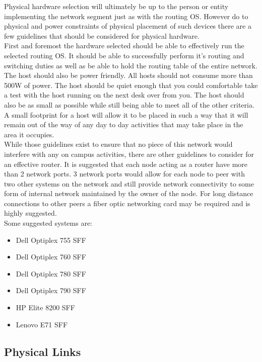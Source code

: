 \documentclass[12pt]{article}
\begin{document}
Physical hardware selection will ultimately be up to the person or entity implementing the network segment just as with the routing OS. However
do to physical and power constraints of physical placement of such devices there are a few guidelines that should be considered for physical hardware.
\\

First and foremost the hardware selected should be able to effectively run the selected routing OS. It should be able to successfully perform it's routing
and switching duties as well as be able to hold the routing table of the entire network. The host should also be power friendly. All hosts should not consume
more than 500W of power. The host should be quiet enough that you could comfortable take a test with the host running on the next desk over from you. The host
should also be as small as possible while still being able to meet all of the other criteria. A small footprint for a host will allow it to be placed in such
a way that it will remain out of the way of any day to day activities that may take place in the area it occupies.
\\

While those guidelines exist to ensure that no piece of this network would interfere with any on campus activities, there are other guidelines to consider
for an effective router. It is suggested that each node acting as a router have more than 2 network ports. 3 network ports would allow for each node to peer
with two other systems on the network and still provide network connectivity to some form of internal network maintained by the owner of the node. For long
distance connections to other peers a fiber optic networking card may be required and is highly suggested.
\\

Some suggested systems are:

\begin{itemize}
	\item Dell Optiplex 755 SFF
	\item Dell Optiplex 760 SFF
	\item Dell Optiplex 780 SFF
	\item Dell Optiplex 790 SFF
	\item HP Elite 8200 SFF
	\item Lenovo E71 SFF
\end{itemize}

\subsection{Physical Links}
\end{document}
